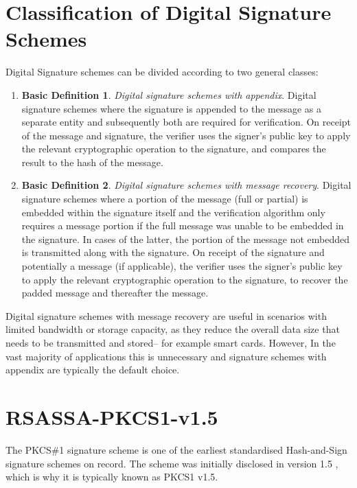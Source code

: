 \documentclass[]{final_report}
\theoremstyle{definition}
\newtheorem{basic}{Basic Definition}
\begin{document}
\section{Classification of Digital Signature Schemes}
Digital Signature schemes can be divided according to two general classes:
\begin{enumerate}
    \item[] \begin{basic} 
\textit{Digital signature schemes with appendix}. Digital signature schemes where the signature is appended to the message as a separate entity and subsequently both are required for verification. On receipt of the message and signature, the verifier uses the signer's public key to apply the relevant cryptographic operation to the signature, and compares the result to the hash of the message.
\end{basic}
    \item[] \begin{basic}
\textit{Digital signature schemes with message recovery}. Digital signature schemes where a portion of the message (full or partial) is embedded within the signature itself and the verification algorithm only requires a message portion if the full message was unable to be embedded in the signature. In cases of the latter, the portion of the message not embedded is transmitted along with the signature. On receipt of the signature and potentially a message (if applicable), the verifier uses the signer's public key to apply the relevant cryptographic operation to the signature, to recover the padded message and thereafter the message.
\end{basic}

\end{enumerate}

Digital signature schemes with message recovery are useful in scenarios with limited bandwidth or storage capacity, as they reduce the overall data size that needs to be transmitted and stored– for example smart cards. However, In the vast majority of applications this is  unnecessary and signature schemes with appendix are typically the default choice.
\section{RSASSA-PKCS1-v1.5}
The PKCS\#1 signature scheme is one of the earliest standardised Hash-and-Sign signature schemes on record. The scheme was initially disclosed in version 1.5 \cite{rfc2313}, which is why it is typically known as PKCS1 v1.5.
\end{document}

